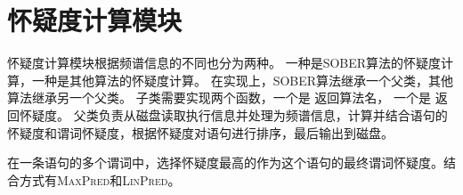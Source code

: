 \section{怀疑度计算模块}

怀疑度计算模块根据频谱信息的不同也分为两种。
一种是SOBER算法的怀疑度计算，一种是其他算法的怀疑度计算。
在实现上，SOBER算法继承一个父类，其他算法继承另一个父类。
子类需要实现两个函数，一个是  返回算法名，
一个是  返回怀疑度。
父类负责从磁盘读取执行信息并处理为频谱信息，计算并结合语句的怀疑度和谓词怀疑度，根据怀疑度对语句进行排序，最后输出到磁盘。

在一条语句的多个谓词中，选择怀疑度最高的作为这个语句的最终谓词怀疑度。结合方式有\textsc{MaxPred}和\textsc{LinPred}。


